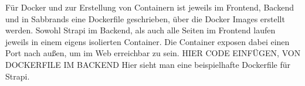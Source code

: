 Für Docker und zur Erstellung von Containern ist jeweils im Frontend, Backend und in Sabbrands eine Dockerfile geschrieben, über die Docker Images erstellt werden. Sowohl Strapi im Backend, als auch alle Seiten im Frontend laufen jeweils in einem eigens isolierten Container. Die Container exposen dabei einen Port nach außen, um im Web erreichbar zu sein.
HIER CODE EINFÜGEN, VON DOCKERFILE IM BACKEND
Hier sieht man eine beispielhafte Dockerfile für Strapi.